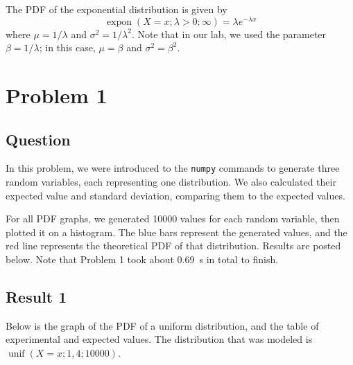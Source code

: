 \documentclass{article}
\renewcommand{\c}[1]{\texttt{#1}}
\DeclareMathOperator{\unif}{unif}
\DeclareMathOperator{\expon}{expon}
\begin{document}
The PDF of the exponential distribution
is given by
\begin{equation*}
    \expon(X = x; \lambda > 0; \infty) = \lambda e^{-\lambda x}
\end{equation*} where \(\mu = 1/\lambda\) and \(\sigma^2 = 1/\lambda^2\).
Note that in our lab, we used the parameter
\(\beta = 1/\lambda\); in this case,
\(\mu = \beta\) and \(\sigma^2 = \beta^2\).

\section{Problem 1}
\subsection{Question} In this problem, we were introduced
to the \c{numpy} commands to generate three random variables,
each representing one distribution.
We also calculated their expected value and standard
deviation, comparing them to the expected values.

For all PDF graphs, we generated \num{10000} values for each
random variable, then plotted it on a histogram. The blue
bars represent the generated values, and the red line
represents the theoretical PDF of that distribution.
Results are posted below. Note that Problem 1 took
about \SI{0.69}{s} in total to finish.

\subsection{Result 1} Below is the graph of the PDF of a
uniform distribution, and the table of experimental
and expected values. The distribution that was modeled
is \(\unif(X = x; 1, 4; \num{10000})\).
\end{document}
